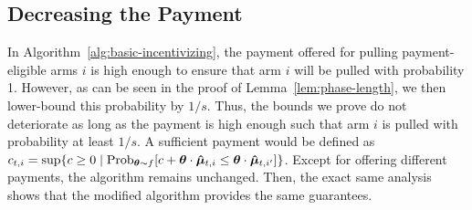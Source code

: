 \subsection{Decreasing the Payment} \label{sec:pi}

In Algorithm~\ref{alg:basic-incentivizing},
the payment  offered for pulling payment-eligible arms $i$
is high enough to ensure that arm $i$ will be pulled with probability 1.
However, as can be seen in the proof of Lemma~\ref{lem:phase-length},
we then lower-bound this probability by $1/s$.
Thus, the bounds we prove do not deteriorate as long as the payment is
high enough such that arm $i$ is pulled with probability at least $1/s$.
A sufficient payment would be defined as
$\Pay{t}{i} = \sup \Set{c \geq 0}{%
  \Prob[\AgV \sim \AgentDist]{c + \AgV \cdot \ArmEV{t}{i} \leq \AgV \cdot \ArmEV{t}{i'}}}$.
Except for offering different payments, the algorithm remains unchanged.
Then, the exact same analysis shows that the modified algorithm
provides the same guarantees.
